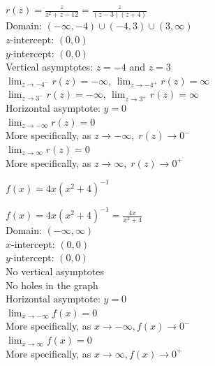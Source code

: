 \documentclass{ximera}
\begin{document}
\begin{question}
\begin{problem}
\begin{solution}
$r(z) = \frac{z}{z^{2} + z - 12} = \frac{z}{(z - 3)(z + 4)}$\\[10pt]
Domain: $(-\infty, -4) \cup (-4, 3) \cup (3, \infty)$\\
$z$-intercept: $(0, 0)$\\
$y$-intercept: $(0, 0)$\\
Vertical asymptotes: $z = -4$ and $z = 3$\\
$\lim_{z \rightarrow -4^{-}} r(z) = -\infty$, $\lim_{z \rightarrow -4^{+}} r(z) = \infty$ \\
$\lim_{z \rightarrow 3^{-}} r(z) = -\infty$, $\lim_{z \rightarrow 3^{+}} r(z) = \infty$ \\
Horizontal asymptote: $y = 0$\\
$\lim_{z \rightarrow -\infty} r(z) = 0$\\
More specifically, as $z \rightarrow -\infty, \; r(z) \rightarrow 0^{-}$\\
$\lim_{z \rightarrow \infty} r(z) = 0$\\
More specifically, as $z \rightarrow \infty, \; r(z) \rightarrow 0^{+}$\\    
\begin{center} 
\end{center}
\end{solution}
\end{problem} 

\begin{problem}
$f(x) = 4x(x^2+4)^{-1}$

\begin{solution}
$f(x) =  4x(x^2+4)^{-1} = \frac{4x}{x^{2} + 4}$\\
Domain: $(-\infty,  \infty)$\\
$x$-intercept:  $(0,0)$\\
$y$-intercept:  $(0,0)$\\
No vertical asymptotes \\
No holes in the graph\\
Horizontal asymptote: $y = 0$ \\
$\lim_{x \rightarrow  -\infty} f(x) = 0$\\
More specifically, as $x \rightarrow -\infty, f(x) \rightarrow 0^{-}$\\
$\lim_{x \rightarrow  \infty} f(x) = 0$\\
More specifically, as $x \rightarrow \infty, f(x) \rightarrow 0^{+}$\\


\end{solution}
\end{problem}
\end{question}
\end{document}
